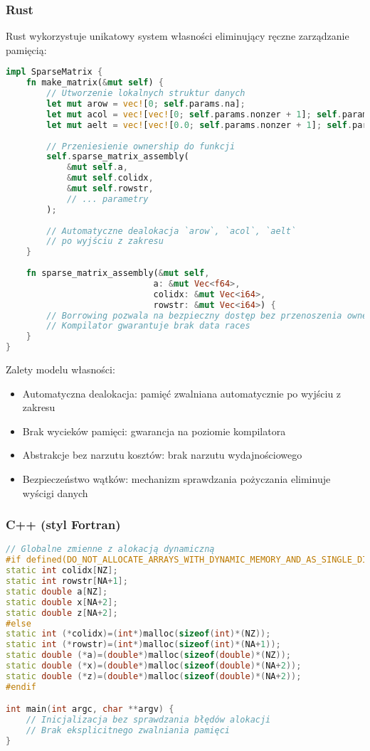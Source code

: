 \subsubsection{Rust}
Rust wykorzystuje unikatowy system własności eliminujący ręczne zarządzanie pamięcią:
\begin{lstlisting}[language=Rust, caption={Zarządzanie pamięcią w Rust}, label={lst:cg_rust_memory}]
    impl SparseMatrix {
    fn make_matrix(&mut self) {
        // Utworzenie lokalnych struktur danych
        let mut arow = vec![0; self.params.na];
        let mut acol = vec![vec![0; self.params.nonzer + 1]; self.params.na];
        let mut aelt = vec![vec![0.0; self.params.nonzer + 1]; self.params.na];
        
        // Przeniesienie ownership do funkcji
        self.sparse_matrix_assembly(
            &mut self.a, 
            &mut self.colidx, 
            &mut self.rowstr,
            // ... parametry
        );
        
        // Automatyczne dealokacja `arow`, `acol`, `aelt` 
        // po wyjściu z zakresu
    }
    
    fn sparse_matrix_assembly(&mut self, 
                             a: &mut Vec<f64>, 
                             colidx: &mut Vec<i64>, 
                             rowstr: &mut Vec<i64>) {
        // Borrowing pozwala na bezpieczny dostęp bez przenoszenia ownership
        // Kompilator gwarantuje brak data races
    }
}
\end{lstlisting}
Zalety modelu własności:
\begin{itemize}
    \item Automatyczna dealokacja: pamięć zwalniana automatycznie po wyjściu z zakresu
    \item Brak wycieków pamięci: gwarancja na poziomie kompilatora
    \item Abstrakcje bez narzutu kosztów: brak narzutu wydajnościowego
    \item Bezpieczeństwo wątków: mechanizm sprawdzania pożyczania eliminuje wyścigi danych
\end{itemize}

\subsubsection{C++ (styl Fortran)}
\begin{lstlisting}[language=C++, caption={Zarządzanie pamięcią w C++ (styl Fortran)}, label={lst:cg_cpp_memory}]
    // Globalne zmienne z alokacją dynamiczną
#if defined(DO_NOT_ALLOCATE_ARRAYS_WITH_DYNAMIC_MEMORY_AND_AS_SINGLE_DIMENSION)
static int colidx[NZ];
static int rowstr[NA+1];
static double a[NZ];
static double x[NA+2];
static double z[NA+2];
#else
static int (*colidx)=(int*)malloc(sizeof(int)*(NZ));
static int (*rowstr)=(int*)malloc(sizeof(int)*(NA+1));
static double (*a)=(double*)malloc(sizeof(double)*(NZ));
static double (*x)=(double*)malloc(sizeof(double)*(NA+2));
static double (*z)=(double*)malloc(sizeof(double)*(NA+2));
#endif

int main(int argc, char **argv) {
    // Inicjalizacja bez sprawdzania błędów alokacji
    // Brak eksplicitnego zwalniania pamięci
}
\end{lstlisting}

